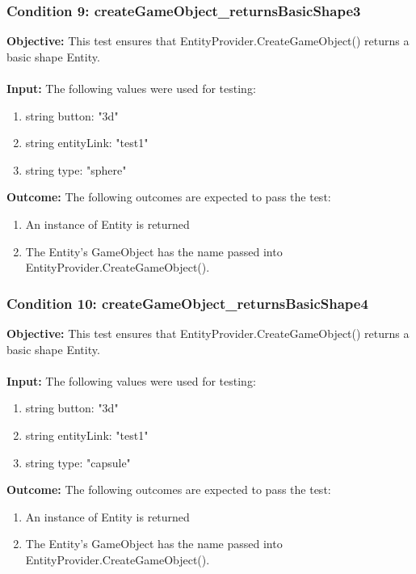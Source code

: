 \documentclass[a4paper,12pt]{article}
\begin{document}
		\subsubsection{Condition 9: createGameObject\_returnsBasicShape3}
			\textbf{Objective:} This test ensures that EntityProvider.CreateGameObject() returns a basic shape Entity.\\\\
			\textbf{Input:} The following values were used for testing:
				\begin{enumerate}
					\item string button: "3d"
					\item string entityLink: "test1"
					\item string type: "sphere"
				\end{enumerate}
			\textbf{Outcome:} The following outcomes are expected to pass the test:
				\begin{enumerate}
					\item An instance of Entity is returned
					\item The Entity's GameObject has the name passed into EntityProvider.CreateGameObject().
				\end{enumerate}
		\subsubsection{Condition 10: createGameObject\_returnsBasicShape4}
			\textbf{Objective:} This test ensures that EntityProvider.CreateGameObject() returns a basic shape Entity.\\\\
			\textbf{Input:} The following values were used for testing:
				\begin{enumerate}
					\item string button: "3d"
					\item string entityLink: "test1"
					\item string type: "capsule"
				\end{enumerate}
			\textbf{Outcome:} The following outcomes are expected to pass the test:
				\begin{enumerate}
					\item An instance of Entity is returned
					\item The Entity's GameObject has the name passed into EntityProvider.CreateGameObject().
				\end{enumerate}
\end{document}
